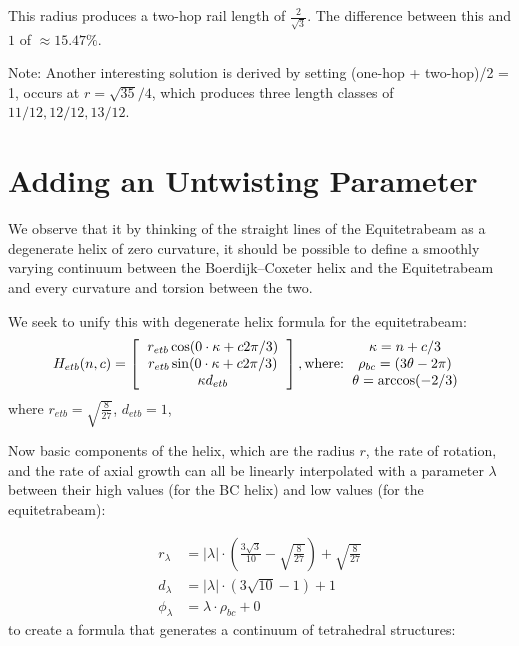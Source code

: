 \documentclass[11pt]{article}
\begin{document}
This radius produces a two-hop rail length of
$\frac{2}{\sqrt{3}}$. The difference between this 
and $1$ of $\approx 15.47\% $.

Note: Another interesting solution is derived by setting (one-hop + two-hop)/2 = 1,  occurs at $r = \sqrt{35}/4$,
which produces three length classes of $11/12, 12/12, 13/12$.



\section{Adding an Untwisting Parameter}

We observe that it by thinking of the straight lines of the Equitetrabeam as a degenerate helix of zero curvature,
it should be possible to define a smoothly varying continuum between the Boerdijk--Coxeter helix and the Equitetrabeam and every
curvature and torsion between the two.

We seek to unify this with degenerate helix formula for the equitetrabeam:
\[
H_{etb}(n,c) =
\left [
  \begin{tabular}{c}
   $ r_{etb}  \cos( 0 \cdot \kappa  + c 2 \pi /3) $\\
   $ r_{etb}  \sin( 0 \cdot \kappa  + c 2 \pi /3) $\\
   $ \kappa d_{etb} $
  \end{tabular}
\right ],
\text{where:}
  \begin{tabular}{c}
 $\kappa = n + c/3$ \\
    $\rho_{bc} = (3 \theta - 2 \pi)$ \\
   $ \theta = \arccos(-2/3) $
  \end{tabular}      
\]
where $ r_{etb} = \sqrt{\frac{8}{27}}$, $d_{etb} = 1$,

Now basic components of the helix, which are the radius $r$, the rate of rotation, and the rate of
axial growth can all be linearly interpolated with a parameter $\lambda$ between their high values (for the BC helix)
and low values (for the equitetrabeam):

\begin{align*}
r_{\lambda}  &=  \lvert \lambda \rvert \cdot (\frac{3 \sqrt{3}}{10}  - \sqrt{\frac{8}{27}}) + \sqrt{\frac{8}{27}}  \\
d_{\lambda} &=   \lvert \lambda \rvert \cdot (3 \sqrt{10} - 1) + 1 \\
\phi_{\lambda} &=  \lambda \cdot \rho_{bc}  + 0
\end{align*}
to create a formula that generates a continuum of tetrahedral structures:
\end{document}
